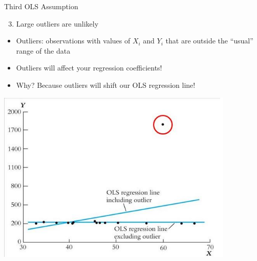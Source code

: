 \documentclass[
  8pt,
  ignorenonframetext,
  dvipsnames]{beamer}
\providecommand{\tightlist}{%
  \setlength{\itemsep}{0pt}\setlength{\parskip}{0pt}}
\let\olditem\item
\renewcommand{\item}{%
  \olditem\vspace{4pt}
}
\begin{document}
\begin{frame}{Third OLS Assumption}
\protect\hypertarget{third-ols-assumption}{}

\begin{enumerate}
\setcounter{enumi}{2}
\tightlist
\item
  Large outliers are unlikely
\end{enumerate}

\begin{itemize}
\tightlist
\item
  Outliers: observations with values of \(X_i\) and \(Y_i\) that are
  outside the ``usual'' range of the data
\item
  Outliers will affect your regression coefficients!
\item
  Why? Because outliers will shift our OLS regression line!
\end{itemize}

\includegraphics[width=0.85\textwidth,height=\textheight]{outliers.jpg}

\end{frame}
\end{document}
